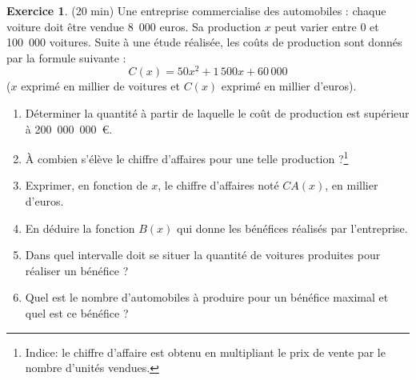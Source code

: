 \documentclass{exam}
\theoremstyle{definition}
\newtheorem{exercice}{Exercice}
\begin{document}
\begin{exercice}{(20 min)}
Une entreprise commercialise des automobiles : chaque voiture doit être vendue 8 000 euros. Sa production $x$ peut varier entre 0 et 100 000 voitures. Suite à une étude réalisée, les coûts de production sont donnés par la formule suivante :
\[
C(x) = 50x^2 + 1\,500x + 60\,000
\]
($x$ exprimé en millier de voitures et $C(x)$ exprimé en millier d’euros).


\begin{enumerate}
    \item Déterminer la quantité à partir de laquelle le coût de production est supérieur à 200 000 000 €.
    \item À combien s’élève le chiffre d’affaires pour une telle production ?\footnote{Indice: le chiffre d'affaire est obtenu en multipliant le prix de vente par le nombre d'unités vendues.}
    \item Exprimer, en fonction de $x$, le chiffre d’affaires noté $CA(x)$, en millier d’euros.
    \item En déduire la fonction $B(x)$ qui donne les bénéfices réalisés par l’entreprise.
    \item Dans quel intervalle doit se situer la quantité de voitures produites pour réaliser un bénéfice ?
    \item Quel est le nombre d’automobiles à produire pour un bénéfice maximal et quel est ce bénéfice ?
\end{enumerate}
\end{exercice}    
\end{document}
